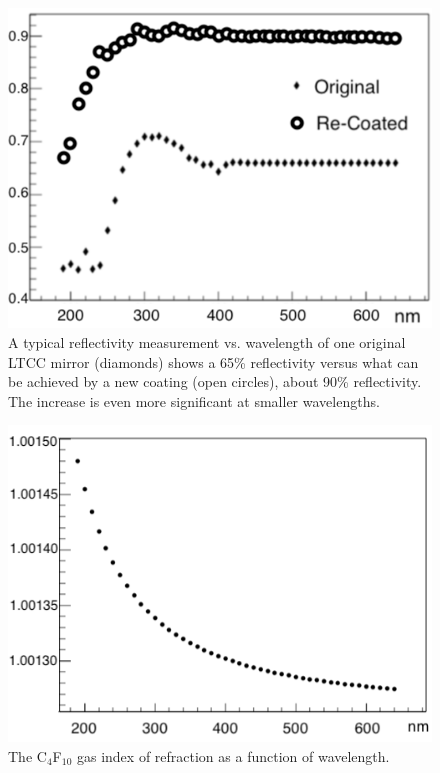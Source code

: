 \begin{figure}
	\centering
	\includegraphics[width=0.98\columnwidth, height=0.7\columnwidth]{img/reflectivityGain.png}
	\caption{A typical reflectivity measurement vs. wavelength of one original LTCC mirror (diamonds) shows a
          65\% reflectivity versus what can be achieved by a new coating (open circles), about 90\% reflectivity. The
          increase is even more significant at smaller wavelengths.}
	\label{fig:reflectivityGain}
\end{figure}

\begin{figure}[b]
	\centering
	\includegraphics[width=0.98\columnwidth, height=0.65\columnwidth]{img/c4f10RefrIndex.png}
	\caption{The C$_4$F$_{10}$ gas index of refraction as a function of wavelength.}
	\label{fig:c4f10RefrIndex}
\end{figure}

